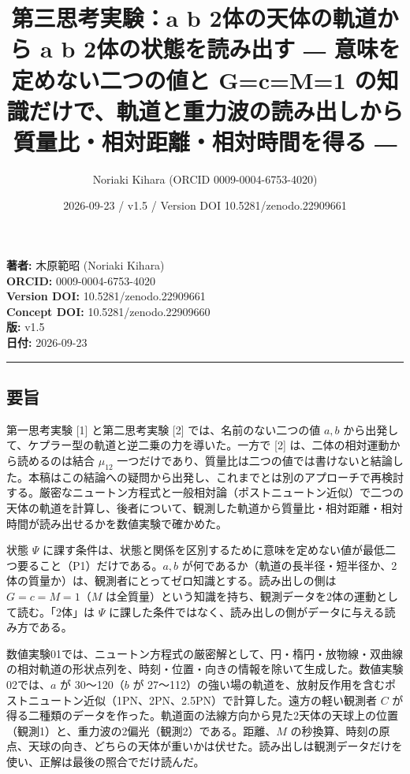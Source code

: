 \documentclass[
  a4paper,
]{ltjsarticle}
\title{第三思考実験：a b 2体の天体の軌道から a b 2体の状態を読み出す ―
意味を定めない二つの値と G=c=M=1
の知識だけで、軌道と重力波の読み出しから質量比・相対距離・相対時間を得る
―}
\author{Noriaki Kihara (ORCID 0009-0004-6753-4020)}
\date{2026-09-23 / v1.5 / Version DOI 10.5281/zenodo.22909661}
\begin{document}
\maketitle

\textbf{著者:} 木原範昭 (Noriaki Kihara)\\
\textbf{ORCID:} 0009-0004-6753-4020\\
\textbf{Version DOI:} 10.5281/zenodo.22909661\\
\textbf{Concept DOI:} 10.5281/zenodo.22909660\\
\textbf{版:} v1.5\\
\textbf{日付:} 2026-09-23

\begin{center}\rule{0.5\linewidth}{0.5pt}\end{center}

\subsection{要旨}\label{ux8981ux65e8}

第一思考実験 {[}1{]} と第二思考実験 {[}2{]} では、名前のない二つの値
\(a, b\) から出発して、ケプラー型の軌道と逆二乗の力を導いた。一方で
{[}2{]} は、二体の相対運動から読めるのは結合 \(\mu_{12}\)
一つだけであり、質量比は二つの値では書けないと結論した。本稿はこの結論への疑問から出発し、これまでとは別のアプローチで再検討する。厳密なニュートン方程式と一般相対論（ポストニュートン近似）で二つの天体の軌道を計算し、後者について、観測した軌道から質量比・相対距離・相対時間が読み出せるかを数値実験で確かめた。

状態 \(\Psi\)
に課す条件は、状態と関係を区別するために意味を定めない値が最低二つ要ること（P1）だけである。\(a, b\)
が何であるか（軌道の長半径・短半径か、2体の質量か）は、観測者にとってゼロ知識とする。読み出しの側は
\(G=c=M=1\)（\(M\)
は全質量）という知識を持ち、観測データを2体の運動として読む。「2体」は
\(\Psi\)
に課した条件ではなく、読み出しの側がデータに与える読み方である。

数値実験01では、ニュートン方程式の厳密解として、円・楕円・放物線・双曲線の相対軌道の形状点列を、時刻・位置・向きの情報を除いて生成した。数値実験02では、\(a\)
が 30〜120（\(b\) が
27〜112）の強い場の軌道を、放射反作用を含むポストニュートン近似（1PN、2PN、2.5PN）で計算した。遠方の軽い観測者
\(C\)
が得る二種類のデータを作った。軌道面の法線方向から見た2天体の天球上の位置（観測1）と、重力波の2偏光（観測2）である。距離、\(M\)
の秒換算、時刻の原点、天球の向き、どちらの天体が重いかは伏せた。読み出しは観測データだけを使い、正解は最後の照合でだけ読んだ。
\end{document}
